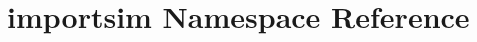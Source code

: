 \hypertarget{namespaceimportsim}{\section{importsim Namespace Reference}
\label{namespaceimportsim}
}
